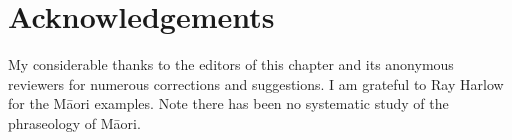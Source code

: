 \documentclass[output=paper]{langsci/langscibook}
\begin{document}
\section*{Acknowledgements}

My considerable thanks to the editors of this chapter 
and its anonymous reviewers for numerous corrections and suggestions.  I 
am grateful to Ray Harlow for the M\=aori examples. Note there has been no 
systematic study of the phraseology of M\=aori.





{\sloppy
\printbibliography[heading=subbibliography,notkeyword=this]
}
\end{document}
